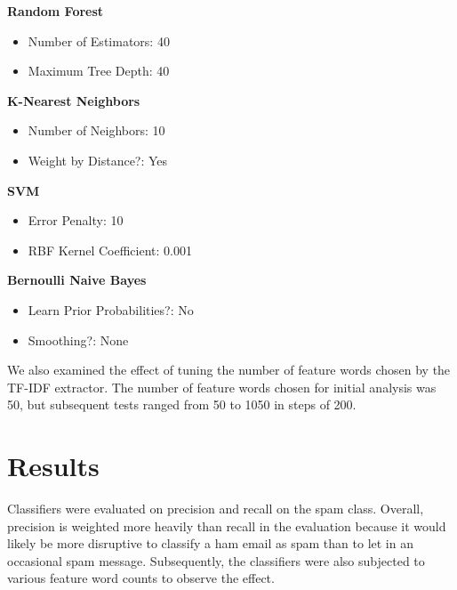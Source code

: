 \documentclass[12pt]{article}
\begin{document}
\begin{multicols}{2}
            \noindent\textbf{Random Forest}
            \begin{itemize}
                \setlength\itemsep{0em}
                \item Number of Estimators: 40
                \item Maximum Tree Depth: 40
            \end{itemize}
            \textbf{K-Nearest Neighbors}
            \begin{itemize}
                \setlength\itemsep{0em}
                \item Number of Neighbors: 10
                \item Weight by Distance?: Yes
            \end{itemize}
            \textbf{SVM}
            \begin{itemize}
                \setlength\itemsep{0em}
                \item Error Penalty: 10
                \item RBF Kernel Coefficient: 0.001
            \end{itemize}
            \textbf{Bernoulli Naive Bayes}
            \begin{itemize}
                \setlength\itemsep{0em}
                \item Learn Prior Probabilities?: No
                \item Smoothing?: None
            \end{itemize}

            We also examined the effect of tuning the number of feature words chosen by the TF-IDF 
            extractor. The number of feature words chosen for initial analysis was 50, but subsequent 
            tests ranged from 50 to 1050 in steps of 200.

            \section{Results}
            Classifiers were evaluated on precision and recall on the spam class. Overall, precision is
            weighted more heavily than recall in the evaluation because it would likely be more disruptive 
            to classify a ham email as spam than to let in an occasional spam message. Subsequently, the 
            classifiers were also subjected to various feature word counts to observe the effect.
    \end{multicols}
\end{document}
